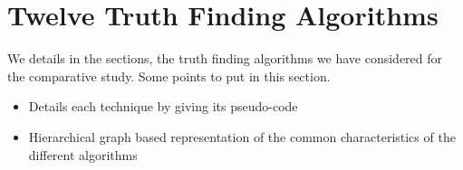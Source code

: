 \section{Twelve Truth Finding Algorithms}

We details in the sections, the truth finding 
algorithms we have considered for the comparative study.
Some points to put in this section.
\begin{itemize}
 \item Details each technique by giving its pseudo-code
 \item Hierarchical graph based representation of the common characteristics of the different algorithms
\end{itemize}
